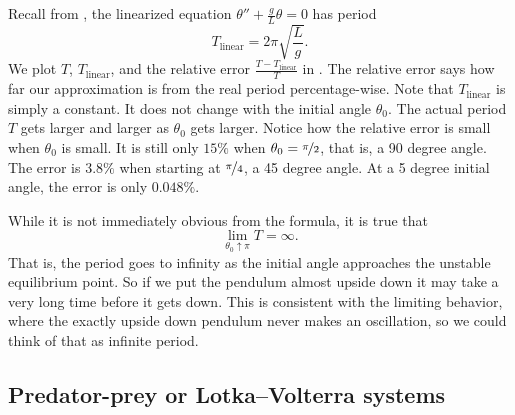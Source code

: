 Recall from , the linearized equation $\theta''+\frac{g}{L}\theta
= 0$ has period
\begin{equation*}
T_{\text{linear}} = 2\pi \sqrt{\frac{L}{g}} .
\end{equation*}
We plot $T$, $T_{\text{linear}}$, and the relative error
$\frac{T-T_{\text{linear}}}{T}$ in .  The relative error
says how far our approximation is from the real period percentage-wise.
Note that $T_{\text{linear}}$ is simply a constant.
It does not change with the initial angle $\theta_0$.
The actual period $T$ gets larger and larger as
$\theta_0$ gets larger.
Notice how the relative error is small when $\theta_0$ is small.  It is
still only $15\%$ when $\theta_0 = \nicefrac{\pi}{2}$, that is, a 90 degree
angle.  The error is $3.8\%$ when starting at $\nicefrac{\pi}{4}$, 
a 45 degree angle.  At a 5 degree initial angle, the error is only $0.048 \%$.

\begin{myfig}
\capstart
\caption{The plot of $T$ and $T_{\text{linear}}$ with $\frac{g}{L} =
1$ (left), and the plot of the relative
error $\frac{T-T_{\text{linear}}}{T}$ (right), for $\theta_0$ between 0 and
$\nicefrac{\pi}{2}$. \label{fig:TvsT0}}
\end{myfig}

While it is not immediately obvious from the formula, it is true that
\begin{equation*}
\lim_{\theta_0 \uparrow \pi} T = \infty .
\end{equation*}
That is, the period goes to infinity as the initial angle approaches the
unstable equilibrium point.  So if we put the pendulum almost upside down it
may take a very long time before it gets down.  This is consistent with the
limiting behavior, where the exactly upside down pendulum never makes an
oscillation, so we could think of that as infinite period.

\subsection{Predator-prey or Lotka--Volterra systems}

